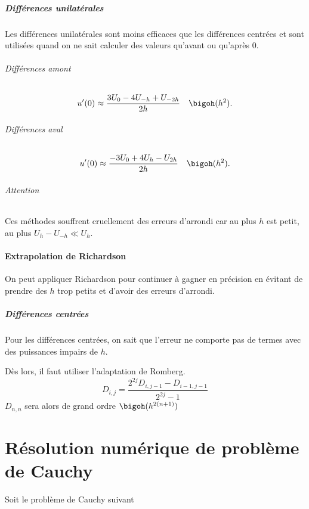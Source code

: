 \subsubsection{Différences unilatérales}
Les différences unilatérales sont moins efficaces que les différences
centrées et sont utilisées quand on ne sait calculer des valeurs qu'avant
ou qu'après 0.

\paragraph{Différences amont}
\begin{align*}
  u'(0) & \approx \frac{3U_0 - 4U_{-h} + U_{-2h}}{2h} & \bigoh(h^2).
\end{align*}

\paragraph{Différences aval}
\begin{align*}
  u'(0) & \approx \frac{-3U_0 + 4U_{h} - U_{2h}}{2h} & \bigoh(h^2).
\end{align*}

\paragraph{Attention}
Ces méthodes souffrent cruellement des erreurs d'arrondi
car au plus $h$ est petit, au plus $U_h - U_{-h} \ll U_h$.

\subsection{Extrapolation de Richardson}
On peut appliquer Richardson pour continuer à gagner en précision
en évitant de prendre des $h$ trop petits et d'avoir des erreurs d'arrondi.

\subsubsection{Différences centrées}
Pour les différences centrées, on sait que l'erreur ne comporte
pas de termes avec des puissances impairs de $h$.

Dès lors, il faut utiliser l'adaptation de Romberg.
\[ D_{i, j} = \frac{2^{2j}D_{i,j-1} - D_{i-1,j-1}}{2^{2j}-1} \]
$D_{n, n}$ sera alors de grand ordre $\bigoh(h^{2(n+1)})$

\part{Résolution numérique de problème de Cauchy}
Soit le problème de Cauchy suivant

